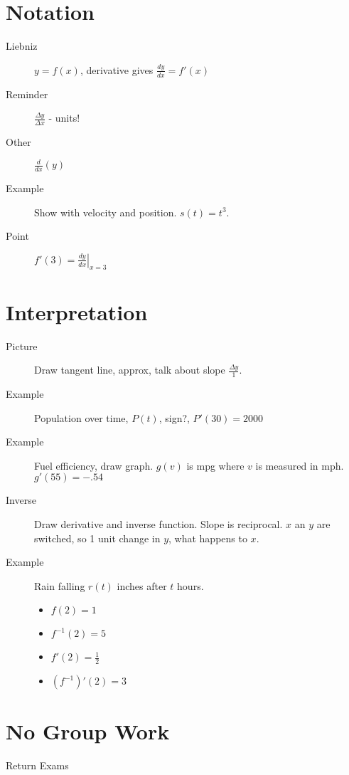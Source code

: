 \documentclass[11pt]{article}
\newcommand{\ds}{\displaystyle}
\begin{document}
\drawtitle

\section*{Notation}
\begin{description}
\item[Liebniz] $y=f(x)$, derivative gives $\ds\frac{dy}{dx} = f'(x)$
\item[Reminder] $\ds\frac{\Delta y}{\Delta x}$ - units!
\item[Other] $\ds\frac{d}{dx}(y)$
\item[Example] Show with velocity and position.  $s(t)=t^3$.
\item[Point] $\ds f'(3)=\left.\frac{dy}{dx}\right|_{x=3}$
\end{description}

\section*{Interpretation}
\begin{description}
\item[Picture] Draw tangent line, approx, talk about slope $\ds\frac{\Delta y}{1}$.
\item[Example] Population over time, $P(t)$, sign?, $P'(30)=2000$
\item[Example] Fuel efficiency, draw graph. $g(v)$ is mpg where $v$ is
  measured in mph.  $g'(55)=-.54$
\item[Inverse] Draw derivative and inverse function.  Slope is
  reciprocal.  $x$ an $y$ are switched, so 1 unit change in $y$, what happens to $x$.
\item[Example] Rain falling $r(t)$ inches after $t$ hours.
  \begin{itemize}
    \item $f(2)=1$
    \item $f^{-1}(2)=5$
    \item $f'(2)=\frac{1}{2}$
    \item $\left(f^{-1}\right)'(2)=3$
  \end{itemize}
\end{description}

\section*{No Group Work}
\begin{description}
\item[Return Exams]
\end{description}
\end{document}
